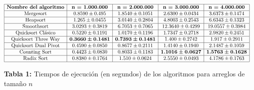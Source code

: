 \documentclass[titlepage]{article}
\begin{document}
	$$\begin{array}{|c|c|c|c|c|}
		\hline
		\textbf{Nombre del algoritmo} & \textbf{n = 1.000.000} & \textbf{n = 2.000.000} & \textbf{n = 3.000.000} & \textbf{n = 4.000.000}\\
		\hline
		\text{Mergesort} & 0.8590 \pm 0.495 & 1.8540 \pm 0.1051 & 2.6300\pm 0.0434 & 3.6373 \pm 0.1474 \\
		\hline
		\text{Heapsort} & 1.265 \pm 0.0455 & 3.0140 \pm 0.2804 & 4.8003 \pm 0.2543 & 6.6343 \pm 0.1323\\
		\hline
		\text{Smoothsort} & 3.0293 \pm 0.3819 & 6.7053 \pm 0.7065 & 12.3640 \pm 0.4299 & 19.0557 \pm 0.3984\\
		\hline
		\text{Quicksort Cl\'asico} & 0.5220 \pm 0.1191 & 1.0170 \pm 0.1196 & 1.7347 \pm 0.2718 & 2.9820 \pm 0.2451\\
		\hline
		\text{Quicksort Three Way} & \boldsymbol{0.3660 \pm 0.1481} & \boldsymbol{0.7393 \pm 0.1481} & 1.400\pm 0.2742 & 1.917 \pm 0.2911\\
		\hline
		\text{Quicksort Dual Pivot} & 0.4590 \pm 0.0850 & 0.8677 \pm 0.2111 & 1.4140\pm 0.1940 & 2.1487 \pm 0.1059\\
		\hline
		\text{Counting Sort} &  0.4423 \pm 0.0830 & 0.8033 \pm 0.1183 & \boldsymbol{1.1016\pm 0.0627} & \boldsymbol{1.5763 \pm 0.1628} \\
		\hline
		\text{Radix Sort} & 0.8380 \pm 0.1764 & 1.510 \pm 0.0624 & 2.5550\pm 0.0493 & 4.1786 \pm 0.1763\\
		\hline
	\end{array}$$\:
	\begin{center}
		\textbf{Tabla 1:} Tiempos de ejecuci\'on (en segundos) de los algoritmos para arreglos de tamaño $n$ 
	\end{center}\:
\end{document}
